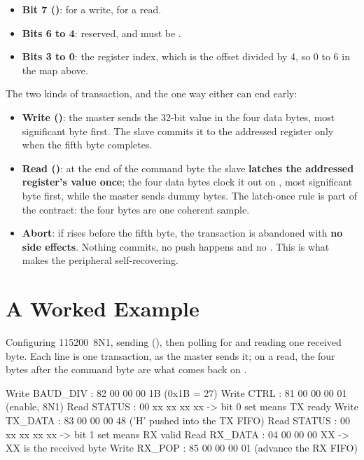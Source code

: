 \begin{itemize}
  \item \textbf{Bit 7 ()}:  for a write,  for a read.
  \item \textbf{Bits 6 to 4}: reserved, and must be .
  \item \textbf{Bits 3 to 0}: the register index, which is the offset divided by 4, so 0 to 6 in the
    map above.
\end{itemize}
The two kinds of transaction, and the one way either can end early:
\begin{itemize}
  \item \textbf{Write ()}: the master sends the 32-bit value in the four data bytes,
    most significant byte first. The slave commits it to the addressed register only when the fifth
    byte completes.
  \item \textbf{Read ()}: at the end of the command byte the slave \textbf{latches the
    addressed register's value once}; the four data bytes clock it out on , most
    significant byte first, while the master sends dummy  bytes. The latch-once rule is
    part of the contract: the four bytes are one coherent sample.
  \item \textbf{Abort}: if  rises before the fifth byte, the transaction is abandoned with
    \textbf{no side effects}. Nothing commits, no  push happens and no .
    This is what makes the peripheral self-recovering.
\end{itemize}

\section{A Worked Example}
\label{proto:example}
Configuring 115200~8N1, sending  (), then polling for and reading one received
byte. Each line is one transaction, as the master sends it; on a read, the four bytes after the
command byte are what comes back on .

\begin{console}
Write BAUD_DIV : 82 00 00 00 1B   (0x1B = 27)
Write CTRL     : 81 00 00 00 01   (enable, 8N1)
Read  STATUS   : 00 xx xx xx xx   -> bit 0 set means TX ready
Write TX_DATA  : 83 00 00 00 48   ('H' pushed into the TX FIFO)
Read  STATUS   : 00 xx xx xx xx   -> bit 1 set means RX valid
Read  RX_DATA  : 04 00 00 00 XX   -> XX is the received byte
Write RX_POP   : 85 00 00 00 01   (advance the RX FIFO)
\end{console}
